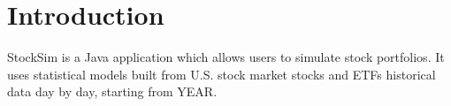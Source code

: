 \chapter{Introduction}
{\Large StockSim} is a Java application which allows users to simulate stock portfolios.
It uses statistical models built from U.S. stock market stocks and ETFs historical data day by day, starting from YEAR. 

